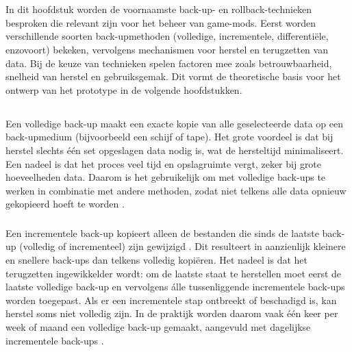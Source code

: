 \chapter{}%
\label{ch:stand-van-zaken}

In dit hoofdstuk worden de voornaamste back-up- en rollback-technieken besproken die relevant zijn voor het beheer van game-mods. Eerst worden verschillende soorten back-upmethoden (volledige, incrementele, differentiële, enzovoort) bekeken, vervolgens mechanismen voor herstel en terugzetten van data. Bij de keuze van technieken spelen factoren mee zoals betrouwbaarheid, snelheid van herstel en gebruiksgemak. Dit vormt de theoretische basis voor het ontwerp van het prototype in de volgende hoofdstukken.

\section{}%
\label{sec:backuptechnieken}

\subsection{}%
\label{subsec:volledigebackup}

Een volledige back-up maakt een exacte kopie van alle geselecteerde data op een back-upmedium (bijvoorbeeld een schijf of tape). Het grote voordeel is dat bij herstel slechts één set opgeslagen data nodig is, wat de hersteltijd minimaliseert. Een nadeel is dat het proces veel tijd en opslagruimte vergt, zeker bij grote hoeveelheden data. Daarom is het gebruikelijk om met volledige back-ups te werken in combinatie met andere methoden, zodat niet telkens alle data opnieuw gekopieerd hoeft te worden \autocite{Sullivan2025}.

\subsection{}%
\label{subsec:incrementelebackup}

Een incrementele back-up kopieert alleen de bestanden die sinds de laatste back-up (volledig of incrementeel) zijn gewijzigd \autocite{Sauer2019}. Dit resulteert in aanzienlijk kleinere en snellere back-ups dan telkens volledig kopiëren. Het nadeel is dat het terugzetten ingewikkelder wordt: om de laatste staat te herstellen moet eerst de laatste volledige back-up en vervolgens álle tussenliggende incrementele back-ups worden toegepast. Als er een incrementele stap ontbreekt of beschadigd is, kan herstel soms niet volledig zijn. In de praktijk worden daarom vaak één keer per week of maand een volledige back-up gemaakt, aangevuld met dagelijkse incrementele back-ups \autocite{Chervenak1998}.


